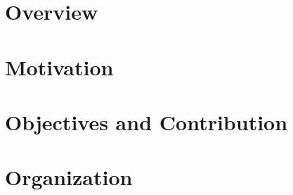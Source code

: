 \section{\label{section:Overview}Overview}
\section{\label{section:Motivation}Motivation}
\section{\label{section:Objectives}Objectives and Contribution}
\section{\label{section:Organization}Organization}
